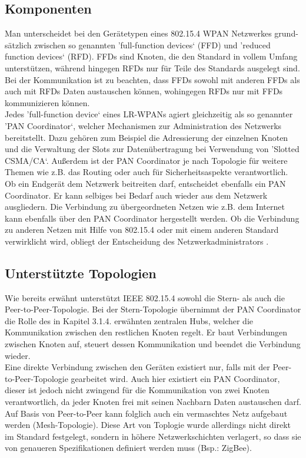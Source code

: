 \subsection{Komponenten}\label{ss:Komponenten}

Man unterscheidet bei den Gerätetypen eines 802.15.4 WPAN Netzwerkes grund-sätzlich zwischen so genannten 'full-function devices‘ (FFD) und 'reduced function devices‘ (RFD). FFDs sind Knoten, die den Standard in vollem Umfang unterstützen, während hingegen RFDs nur für Teile des Standards ausgelegt sind. Bei der Kommunikation ist zu beachten, dass FFDs sowohl mit anderen FFDs als auch mit RFDs Daten austauschen können, wohingegen RFDs nur mit FFDs kommunizieren können. \\
Jedes 'full-function device‘ eines LR-WPANs agiert gleichzeitig als so genannter 'PAN Coordinator‘, welcher Mechanismen zur Administration des Netzwerks bereitstellt. Dazu gehören zum Beispiel die Adressierung der einzelnen Knoten und die Verwaltung der Slots zur Datenübertragung bei Verwendung von 'Slotted CSMA/CA‘. Außerdem ist der PAN Coordinator je nach Topologie für weitere Themen wie z.B. das Routing oder auch für Sicherheitsaspekte verantwortlich. \\
Ob ein Endgerät dem Netzwerk beitreiten darf, entscheidet ebenfalls ein PAN Coordinator. Er kann selbiges bei Bedarf auch wieder aus dem Netzwerk ausgliedern. Die Verbindung zu übergeordneten Netzen wie z.B. dem Internet kann ebenfalls über den PAN Coordinator hergestellt werden. Ob die Verbindung zu anderen Netzen mit Hilfe von 802.15.4 oder mit einem anderen Standard verwirklicht wird, obliegt der Entscheidung des Netzwerkadministrators \cite{d:hesse} \cite{d:ieee}.

\subsection{Unterstützte Topologien}\label{ss:UnterstutzeTopologien}

Wie bereits erwähnt unterstützt IEEE 802.15.4 sowohl die Stern- als auch die Peer-to-Peer-Topologie. Bei der Stern-Topologie übernimmt der PAN Coordinator die Rolle des in Kapitel 3.1.4. erwähnten zentralen Hubs, welcher die Kommunikation zwischen den restlichen Knoten regelt. Er baut Verbindungen zwischen Knoten auf, steuert dessen Kommunikation und beendet die Verbindung wieder. \\
Eine direkte Verbindung zwischen den Geräten existiert nur, falls mit der Peer-to-Peer-Topologie gearbeitet wird. Auch hier existiert ein PAN Coordinator, dieser ist jedoch nicht zwingend für die Kommunikation von zwei Knoten verantwortlich, da jeder Knoten frei mit seinen Nachbarn Daten austauschen darf.  Auf Basis von Peer-to-Peer kann folglich auch ein vermaschtes Netz aufgebaut werden (Mesh-Topologie). Diese Art von Toplogie wurde allerdings nicht direkt im Standard festgelegt, sondern in höhere Netzwerkschichten verlagert, so dass sie von genaueren Spezifikationen definiert werden muss (Bsp.: ZigBee). 

